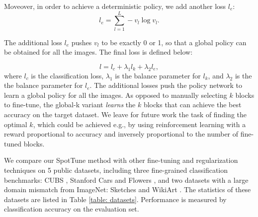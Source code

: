 \documentclass[10pt,twocolumn,letterpaper]{article}
\begin{document}
Moveover, in order to achieve a deterministic policy, we add another loss $l_{e}$:
\begin{equation}
    l_{e} = \sum_{l=1}^L -v_l\log v_l.
\end{equation}

The additional loss $l_{e}$ pushes $v_l$ to be exactly 0 or 1, so that a global policy can be obtained for all the images. The final loss is defined below:

\begin{equation}
    l = l_c + \lambda_1 l_{k} + \lambda_2 l_{e},
\end{equation}\noindent where $l_c$ is the classification loss, $\lambda_1$ is the balance parameter for $l_{k}$, and $\lambda_2$ is the the balance parameter for $l_{e}$. The additional losses push the policy network to learn a global policy for all the images. %
As opposed to manually selecting $k$ blocks to fine-tune, the global-k variant {\em learns} the $k$ blocks that can achieve the best accuracy on the target dataset. We leave for future work the task of finding the optimal $k$, which could be achieved e.g., by using reinforcement learning with a reward proportional to accuracy and inversely proportional to the number of fine-tuned blocks.

We compare our SpotTune method with other fine-tuning and regularization techniques on 5 public datasets, including three fine-grained classification benchmarks: CUBS \cite{wah2011caltech}, Stanford Cars \cite{krause20133d} and Flowers \cite{nilsback2008automated}, and two datasets with a large domain mismatch from ImageNet: Sketches \cite{eitz2012humans} and WikiArt \cite{saleh2015large}. The statistics of these datasets are listed in Table \ref{table: datasets}. Performance is measured by classification accuracy on the evaluation set.
\end{document}
